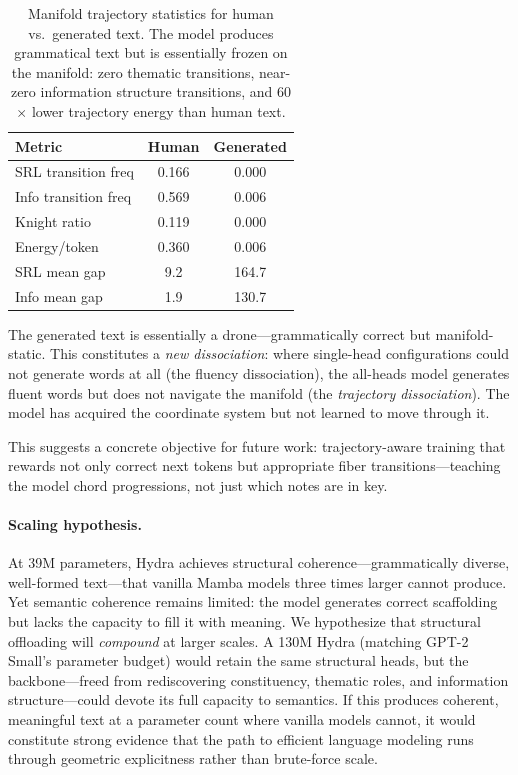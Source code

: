 \documentclass[11pt]{article}
\begin{document}
\begin{table}[t]
\centering
\small
\begin{tabular}{@{}lcc@{}}
\toprule
\textbf{Metric} & \textbf{Human} & \textbf{Generated} \\
\midrule
SRL transition freq & 0.166 & 0.000 \\
Info transition freq & 0.569 & 0.006 \\
Knight ratio & 0.119 & 0.000 \\
Energy/token & 0.360 & 0.006 \\
SRL mean gap & 9.2 & 164.7 \\
Info mean gap & 1.9 & 130.7 \\
\bottomrule
\end{tabular}
\caption{Manifold trajectory statistics for human vs.\ generated text. 
The model produces grammatical text but is essentially frozen on the 
manifold: zero thematic transitions, near-zero information structure 
transitions, and 60$\times$ lower trajectory energy than human text.}
\label{tab:trajectory}
\end{table}

The generated text is essentially a drone---grammatically correct but 
manifold-static. This constitutes a \emph{new dissociation}: where 
single-head configurations could not generate words at all (the fluency 
dissociation), the all-heads model generates fluent words but does not 
navigate the manifold (the \emph{trajectory dissociation}). The model 
has acquired the coordinate system but not learned to move through it.

This suggests a concrete objective for future work: trajectory-aware 
training that rewards not only correct next tokens but appropriate 
fiber transitions---teaching the model chord progressions, not just 
which notes are in key.

\paragraph{Scaling hypothesis.}
At 39M parameters, Hydra achieves structural coherence---grammatically 
diverse, well-formed text---that vanilla Mamba models three times larger 
cannot produce. Yet semantic coherence remains limited: the model 
generates correct scaffolding but lacks the capacity to fill it with 
meaning. We hypothesize that structural offloading will \emph{compound} 
at larger scales. A 130M Hydra (matching GPT-2 Small's parameter budget) 
would retain the same structural heads, but the backbone---freed from 
rediscovering constituency, thematic roles, and information structure---could 
devote its full capacity to semantics. If this produces coherent, 
meaningful text at a parameter count where vanilla models cannot, 
it would constitute strong evidence that the path to efficient language 
modeling runs through geometric explicitness rather than brute-force scale.
\end{document}
